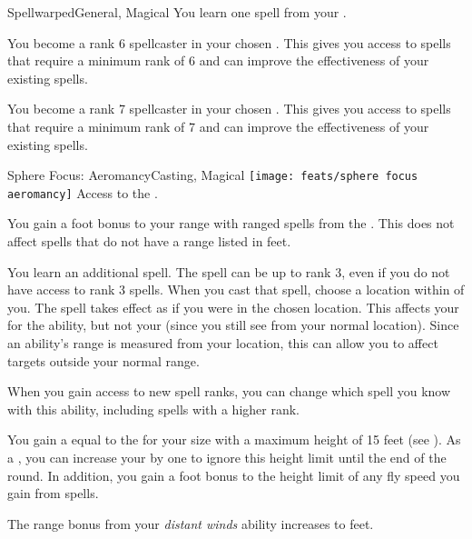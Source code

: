 \begin{magicalfeat}{Spellwarped}{General, Magical}
     You learn one spell from your .

     You become a rank 6 spellcaster in your chosen .
    This gives you access to spells that require a minimum rank of 6 and can improve the effectiveness of your existing spells.

     You become a rank 7 spellcaster in your chosen .
    This gives you access to spells that require a minimum rank of 7 and can improve the effectiveness of your existing spells.
  \end{magicalfeat}

  \begin{magicalfeat}{Sphere Focus: Aeromancy}{Casting, Magical}
    \texttt{[image: feats/sphere focus aeromancy]}
    \featpre Access to the  .

     You gain a  foot bonus to your range with ranged spells from the  .
    This does not affect spells that do not have a range listed in feet.

     You learn an additional spell.
    The spell can be up to rank 3, even if you do not have access to rank 3 spells.
    When you cast that spell, choose a location within \shortrange of you.
    The spell takes effect as if you were in the chosen location.
    This affects your  for the ability, but not your  (since you still see from your normal location).
    Since an ability's range is measured from your location, this can allow you to affect targets outside your normal range.

    When you gain access to new spell ranks, you can change which spell you know with this ability, including spells with a higher rank.

     You gain a  equal to the  for your size with a maximum height of 15 feet (see ).
    As a , you can increase your  by one to ignore this height limit until the end of the round.
    In addition, you gain a  foot bonus to the height limit of any fly speed you gain from  spells.

     The range bonus from your \textit{distant winds} ability increases to  feet.
  \end{magicalfeat}

